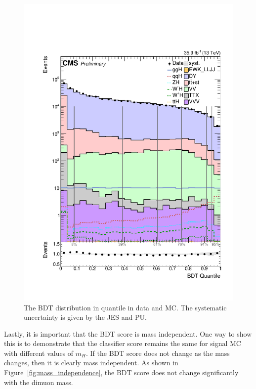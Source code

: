 \begin{figure}[h!]
\centering
\includegraphics[width=0.5\linewidth]{images/bdt_cats/BdtOnH_QM_bkg}
  \caption[The BDT distribution in data and MC by quantile.]
  {The BDT distribution in quantile in data and MC. The systematic uncertainty is given by the JES and PU.}
  \label{fig:bdt_quantile}
\end{figure}

Lastly, it is important that the BDT score is mass independent. One way to
show this is to demonstrate that the classifier score remains the same for signal MC with different values of
$m_H$. If the BDT score does not change as the mass changes, then it is clearly mass independent. As shown in
Figure~\ref{fig:mass_independence}, the BDT score does not change significantly with the dimuon mass.

